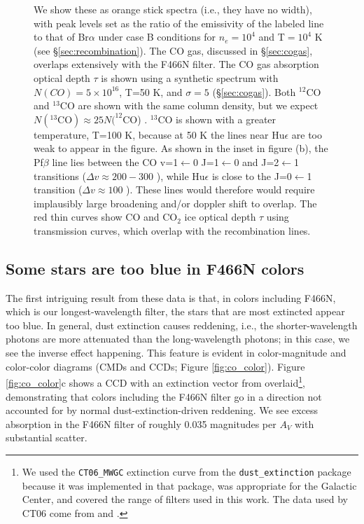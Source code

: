 \documentclass[times,astrosymb,twocolumn]{aastex631}
\def\rr#1{#1}
\begin{document}
\begin{figure}
{    We show these as orange stick spectra (i.e., they have no width), with peak levels set as the ratio of the emissivity of the labeled line to that of Br$\alpha$ under case B conditions for $n_e=10^4$ \percc and T$=10^4$ K (see \S \ref{sec:recombination}).
    The CO gas, discussed in \S \ref{sec:cogas}, overlaps extensively with the F466N filter.
    The CO gas absorption optical depth $\tau$ is shown using a synthetic spectrum with $N(CO)=5\times10^{16}$, T=50 K, and $\sigma=5$ \kms (\S \ref{sec:cogas}).
    \rr{Both $^{12}$CO and $^{13}$CO are shown with the same column density, but we expect $N(^{13}\mathrm{CO})\approx25 N(^{12}\mathrm{CO}$) \citep[e.g.][]{Henkel1985}.}
    \rr{$^{13}$CO is shown with a greater temperature, T=100 K, because at 50 K the lines near Hu$\epsilon$ are too weak to appear in the figure.}
    \rr{As shown in the inset in figure (b),} the Pf$\beta$ line lies between the CO v=\rr{1$\leftarrow$0 J=1$\leftarrow$0 and J=2$\leftarrow$1} transitions ($\Delta v \approx 200-300$ \kms), while Hu$\epsilon$ is close to the \rr{J=0$\leftarrow$1} transition ($\Delta v\approx 100$ \kms).
    These lines would therefore would require \rr{implausibly} large broadening and/or doppler shift to overlap.
    The red \rr{thin} curves show CO and CO$_2$ ice optical depth $\tau$ using \citet{Hudgins1993} transmission curves, which overlap with the recombination lines.
    }
    \label{fig:LinesInBand}
\end{figure}


\subsection{Some stars are too blue in F466N colors}
\label{sec:bluestars}
The first intriguing result from these data is that, in colors including F466N, which is our longest-wavelength filter, the stars that are most extincted appear too blue.
In general, dust extinction causes reddening, i.e., the shorter-wavelength photons are more attenuated than the long-wavelength photons; in this case, we see the inverse effect happening.
This feature is evident in color-magnitude and color-color diagrams (\rr{CMDs and CCDs;} Figure \ref{fig:co_color}).
Figure \ref{fig:co_color}c shows a \rr{CCD} with an extinction vector from \citet[][hereafter CT06]{Chiar2006} overlaid\footnote{\rr{We used the \texttt{CT06\_MWGC} extinction curve from the \texttt{dust\_extinction} package because it was implemented in that package, was appropriate for the Galactic Center, and covered the range of filters used in this work.  The data used by CT06 come from \citet{Lutz1999} and \citet{Indebetouw2005}.}}, demonstrating that \rr{colors including} the F466N \rr{filter go in a direction not accounted for by normal dust-extinction-driven reddening}.
We see excess absorption in the F466N filter of roughly 0.035 magnitudes per $A_V$ with substantial scatter.
\end{document}
